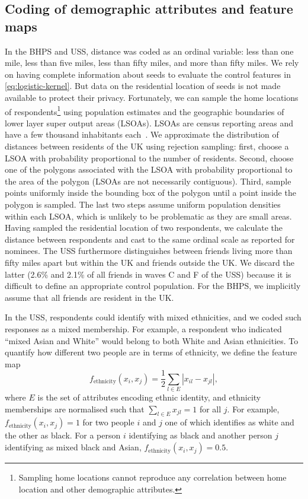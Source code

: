 \documentclass{scrartcl}
\newcommand{\abs}[1]{\left|#1\right|}
\begin{document}
\begin{refsection}
\section{Coding of demographic attributes and feature maps\label{app:coding-and-features}}

In the BHPS and USS, distance was coded as an ordinal variable: less than one mile, less than five miles, less than fifty miles, and more than fifty miles. We rely on having complete information about seeds to evaluate the control features in \cref{eq:logistic-kernel}. But data on the residential location of seeds is not made available to protect their privacy. Fortunately, we can sample the home locations of respondents\footnote{Sampling home locations cannot reproduce any correlation between home location and other demographic attributes.} using population estimates and the geographic boundaries of lower layer super output areas (LSOAs). LSOAs are census reporting areas and have a few thousand inhabitants each~\cite{Lsoas}. We approximate the distribution of distances between residents of the UK using rejection sampling: first, choose a LSOA with probability proportional to the number of residents. Second, choose one of the polygons associated with the LSOA with probability proportional to the area of the polygon (LSOAs are not necessarily contiguous). Third, sample points uniformly inside the bounding box of the polygon until a point inside the polygon is sampled. The last two steps assume uniform population densities within each LSOA, which is unlikely to be problematic as they are small areas. Having sampled the residential location of two respondents, we calculate the distance between respondents and cast to the same ordinal scale as reported for nominees. The USS furthermore distinguishes between friends living more than fifty miles apart but within the UK and friends outside the UK. We discard the latter (2.6\% and 2.1\% of all friends in waves C and F of the USS) because it is difficult to define an appropriate control population. For the BHPS, we implicitly assume that all friends are resident in the UK.

In the USS, respondents could identify with mixed ethnicities, and we coded such responses as a mixed membership. For example, a respondent who indicated ``mixed Asian and White'' would belong to both White and Asian ethnicities. To quantify how different two people are in terms of ethnicity, we define the feature map
\begin{equation*}
    f_\text{ethnicity}(x_i, x_j) = \frac{1}{2} \sum_{l\in E}\abs{x_{il}-x_{jl}},
\end{equation*}
where $E$ is the set of attributes encoding ethnic identity, and ethnicity memberships are normalised such that $\sum_{l\in E}x_{jl}=1$ for all $j$. For example, $f_\text{ethnicity}(x_i, x_j)=1$ for two people $i$ and $j$ one of which identifies as white and the other as black. For a person $i$ identifying as black and another person $j$ identifying as mixed black and Asian, $f_\text{ethnicity}(x_i, x_j)=0.5$.


\end{refsection}
\end{document}
